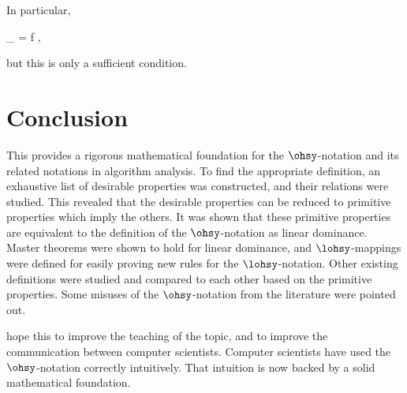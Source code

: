 \documentclass[b5paper, english, oneside]{memoir}
\begin{document}
\begin{example}
In particular,
\begin{eqs}
\liminf_{}  = \infty \implies f \in {},
\end{eqs}
but this is only a sufficient condition.
\end{example}















































\chapter{Conclusion}
\label{Conclusion}

This \manuscript{} provides a rigorous mathematical foundation for the $\ohsy$-notation and its related notations in algorithm analysis. To find the appropriate definition, an exhaustive list of desirable properties was constructed, and their relations were studied. This revealed that the desirable properties can be reduced to \nprim{} primitive properties which imply the others. It was shown that these primitive properties are equivalent to the definition of the $\ohsy$-notation as linear dominance. Master theorems were shown to hold for linear dominance, and $\lohsy$-mappings were defined for easily proving new rules for the $\lohsy$-notation. Other existing definitions were studied and compared to each other based on the primitive properties. Some misuses of the $\ohsy$-notation from the literature were pointed out.

\We{} hope this \manuscript{} to improve the teaching of the topic, and to improve the communication between computer scientists. Computer scientists have used the $\ohsy$-notation correctly intuitively. That intuition is now backed by a solid mathematical foundation.
\end{document}

